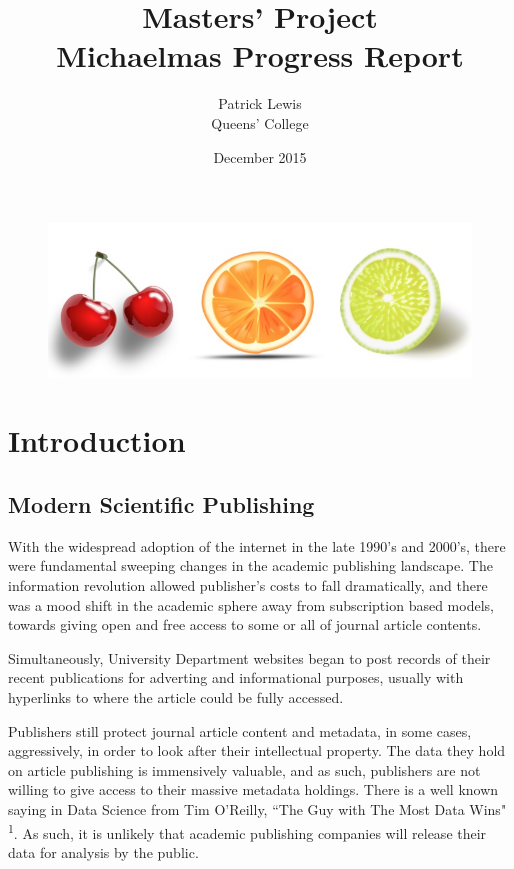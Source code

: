 \documentclass[11pt, oneside]{article}   	%
\title{Masters' Project \\Michaelmas Progress Report}
\author{Patrick Lewis \\Queens' College}
\date{December 2015}							%
\begin{document}
\maketitle
\begin{figure}[H]
    \centering
    \includegraphics[scale=0.5]{TITLE.png}
\end{figure}
\section{Introduction}
\subsection{Modern Scientific Publishing}
With the widespread adoption of the internet in the late 1990's and 2000's, there were fundamental sweeping changes in the academic publishing landscape. The information revolution allowed publisher's costs to fall dramatically, and there was a mood shift in the academic sphere away from subscription based models, towards giving open and free access to some or all of journal article contents.

Simultaneously, University Department websites began to post records of their recent publications for adverting and informational purposes, usually with hyperlinks to where the article could be fully accessed.

Publishers still protect journal article content and metadata, in some cases, aggressively, in order to look after their intellectual property. The data they hold on article publishing is immensively valuable, and as such, publishers are not willing to give access to their massive metadata holdings. There is a well known saying in Data Science from Tim O'Reilly, ``The Guy with The Most Data Wins" \textsuperscript{1}. As such, it is unlikely that academic publishing companies will release their data for analysis by the public.
\end{document}

